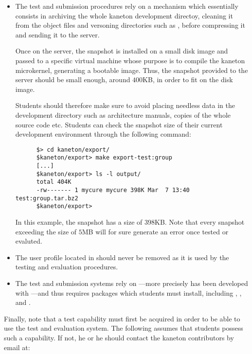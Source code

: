 \begin{itemize}
  \item
    The test and submission procedures rely on a mechanism which essentially
    consists in archiving the whole kaneton development directoy, cleaning it
    from the object files and versoning directories such as ,
     \etc{} before compressing it and sending it to the server.

    \-

    Once on the server, the snapshot is installed on a small disk image and
    passed to a specific virtual machine whose purpose is to compile the
    kaneton microkernel, generating a bootable image. Thus, the snapshot
    provided to the server should be small enough, around $400$KB, in order
    to fit on the disk image.

    \-

    Students should therefore make sure to avoid placing needless data in
    the development directory such as architecture manuals, copies of
    the whole source code etc. Students can check the snapshot size of their
    current development environment through the following command:

    \begin{verbatim}
      $> cd kaneton/export/
      $kaneton/export> make export-test:group
      [...]
      $kaneton/export> ls -l output/
      total 404K
      -rw------- 1 mycure mycure 398K Mar  7 13:40 test:group.tar.bz2
      $kaneton/export> 
    \end{verbatim}

    In this example, the snapshot has a size of $398$KB. Note that every
    snapshot exceeding the size of $5$MB will for sure generate an error
    once tested or evaluted.
  \item
    The  user profile located in
     should never be removed as
    it is used by the testing and evaluation procedures.
  \item
    The test and submission systems rely on ---more precisely
    has been developed with ---and thus requires packages
    which students must install, including , ,
     and .
\end{itemize}

Finally, note that a test capability must first be acquired in order to be
able to use the test and evaluation system. The following assumes that
students possess such a capability. If not, he or he should contact the
kaneton contributors by email at:

